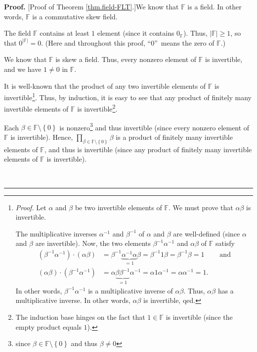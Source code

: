 \documentclass[numbers=enddot,12pt,final,onecolumn,notitlepage]{scrartcl}%
\theoremstyle{definition}
\newenvironment{proof}[1][Proof]{\noindent\textbf{#1.} }{\ \rule{0.5em}{0.5em}}
\let\prodnonlimits\prod
\renewcommand{\prod}{\prodnonlimits\limits}
\begin{document}
\begin{proof}
[Proof of Theorem \ref{thm.field-FLT}.]We know that $\mathbb{F}$ is a field.
In other words, $\mathbb{F}$ is a commutative skew field.

The field $\mathbb{F}$ contains at least $1$ element (since it contains
$0_{\mathbb{F}}$). Thus, $\left\vert \mathbb{F}\right\vert \geq1$, so that
$0^{\left\vert \mathbb{F}\right\vert }=0$. (Here and throughout this proof,
\textquotedblleft$0$\textquotedblright\ means the zero of $\mathbb{F}$.)

We know that $\mathbb{F}$ is skew a field. Thus, every nonzero element of
$\mathbb{F}$ is invertible, and we have $1\neq0$ in $\mathbb{F}$.

It is well-known that the product of any two invertible elements of
$\mathbb{F}$ is invertible\footnote{\textit{Proof.} Let $\alpha$ and $\beta$
be two invertible elements of $\mathbb{F}$. We must prove that $\alpha\beta$
is invertible.
\par
The multiplicative inverses $\alpha^{-1}$ and $\beta^{-1}$ of $\alpha$ and
$\beta$ are well-defined (since $\alpha$ and $\beta$ are invertible). Now, the
two elements $\beta^{-1}\alpha^{-1}$ and $\alpha\beta$ of $\mathbb{F}$ satisfy%
\begin{align*}
\left(  \beta^{-1}\alpha^{-1}\right)  \cdot\left(  \alpha\beta\right)   &
=\beta^{-1}\underbrace{\alpha^{-1}\alpha}_{=1}\beta=\beta^{-1}1\beta
=\beta^{-1}\beta=1\ \ \ \ \ \ \ \ \ \ \text{and}\\
\left(  \alpha\beta\right)  \cdot\left(  \beta^{-1}\alpha^{-1}\right)   &
=\alpha\underbrace{\beta\beta^{-1}}_{=1}\alpha^{-1}=\alpha1\alpha^{-1}%
=\alpha\alpha^{-1}=1.
\end{align*}
In other words, $\beta^{-1}\alpha^{-1}$ is a multiplicative inverse of
$\alpha\beta$. Thus, $\alpha\beta$ has a multiplicative inverse. In other
words, $\alpha\beta$ is invertible, qed.}. Thus, by induction, it is easy to
see that any product of finitely many invertible elements of $\mathbb{F}$ is
invertible\footnote{The induction base hinges on the fact that $1\in
\mathbb{F}$ is invertible (since the empty product equals $1$).}.

Each $\beta\in\mathbb{F}\setminus\left\{  0\right\}  $ is
nonzero\footnote{since $\beta\in\mathbb{F}\setminus\left\{  0\right\}  $ and
thus $\beta\neq0$} and thus invertible (since every nonzero element of
$\mathbb{F}$ is invertible). Hence, $\prod_{\beta\in\mathbb{F}\setminus
\left\{  0\right\}  }\beta$ is a product of finitely many invertible elements
of $\mathbb{F}$, and thus is invertible (since any product of finitely many
invertible elements of $\mathbb{F}$ is invertible).


\end{proof}
\end{document}
